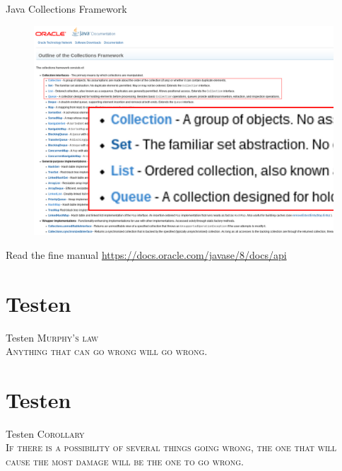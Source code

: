 \documentclass[18pt]{beamer}
\begin{document}
\begin{frame}{Java Collections Framework}
    \begin{figure}
        \includegraphics[scale=.28]{img/javacollectionsframework.png}
    \end{figure}
\end{frame}

\begin{frame}{Read the fine manual}
    \Large{\url{https://docs.oracle.com/javase/8/docs/api}}
\end{frame}



\section{Testen}

\begin{frame}{Testen}
    \textsc{\LARGE{Murphy's law}}\\
    \textsc{Anything that can go wrong will go wrong.}
\end{frame}

\section{Testen}

\begin{frame}{Testen}
    \textsc{\LARGE{Corollary}}\\
    \textsc{If there is a possibility of several things going wrong, the one that will cause the most damage will be the one to go wrong.}
\end{frame}
\end{document}
